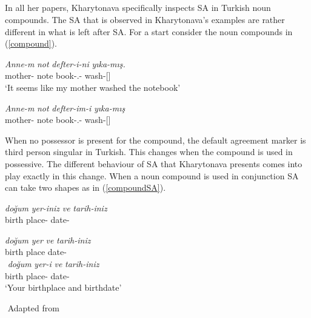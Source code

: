 \subsection{\cite{kharytonava2011morphology, kharytonava2012word,kharytonava2012taming}}

In all her papers, Kharytonava specifically inspects SA in Turkish noun compounds. The SA that is observed in Kharytonava's examples are rather different in what is left after SA. For a start consider the noun compounds in (\ref{compound}).

\begin{exe}
    \ex \label{compound}
    \begin{xlist}
        \ex \gll
        \textit{Anne-m} \textit{not} \textit{defter-i-ni} \textit{yıka-mış.} \\ mother-{\First}{\Sg} note book-{\Third}{\Sg}.{\Poss}-{\Acc} wash-{\Prf}[{\Third}{\Sg}] \\
        \glt `It seems like my mother washed the notebook'
        
        \ex \gll 
        \textit{Anne-m} \textit{not} \textit{defter-im-i} \textit{yıka-mış} \\ mother-{\First}{\Sg} note book-{\First}{\Sg}.{\Poss}-{\Acc} wash-{\Prf}[{\Third}{\Sg}] \\
    \end{xlist}
\end{exe}

When no possessor is present for the compound, the default agreement marker is third person singular in Turkish. This changes when the compound is used in possessive. The different behaviour of SA that Kharytonava presents comes into play exactly in this change. When a noun compound is used in conjunction SA can take two shapes as in (\ref{compoundSA}).

\begin{exe}
    \ex \label{compoundSA}
    \begin{xlist}
        \ex
        \gll 
        \textit{doğum} \textit{yer-iniz} \textit{ve} \textit{tarih-iniz} \\ birth place-{\Spl} {\And} date-{\Spl} \\
        \glt ${}$
        
        \ex \label{compoundSAb}
        \gll 
        \textit{doğum} \textit{yer} \textit{ve} \textit{tarih-iniz} \\ birth place {\And} date-{\Second}{\Pl} \\
        \glt ${}$
        \ex \label{compoundSAc}
        \gll
        \textit{doğum} \textit{yer-i} \textit{ve} \textit{tarih-iniz} \\ birth place-{\Third}{\Sg} {\And} date-{\Second}{\Pl} \\
        \glt `Your birthplace and birthdate'
    \end{xlist}
    ${}$ \hfill Adapted from \cite{kharytonava2012taming}
\end{exe}

